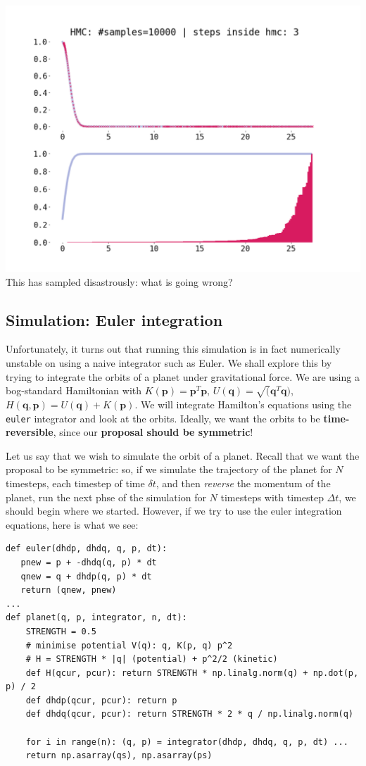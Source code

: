 \documentclass[titlepage]{article}
\newcommand{\p}{\mathbf{p}}
\newcommand{\q}{\mathbf{q}}
\begin{document}
\includegraphics[width=\textwidth]{mcmc-hmc-WRONG-euler-1d-exp.png}
This has sampled disastrously: what is going wrong?

\subsection{Simulation: Euler integration}
Unfortunately, it turns out that running this simulation is in fact numerically
unstable on using a naive integrator such as Euler. We shall explore this
by trying to integrate the orbits of a planet under gravitational force. 
We are using a bog-standard Hamiltonian with 
$K(\p) = \p^T \p$, $U(\q) = \sqrt(\q^T \q)$, $H(\q, \p) = U(\q) + K(\p)$.
We will integrate Hamilton's equations using the \texttt{euler} integrator
and look at the orbits. Ideally, we want the orbits to be \textbf{time-reversible},
since our \textbf{proposal should be symmetric}!

Let us say that we wish to simulate the orbit of a planet. Recall that we want
the proposal to be symmetric: so, if we simulate the trajectory of the planet
for $N$ timesteps, each timestep of time $\delta t$, and then \emph{reverse}
the momentum of the planet, run the next phse of the simulation for $N$
timesteps with timestep $\Delta t$, we should begin where we started. However,
if we try to use the euler integration equations, here is what we see:

\begin{verbatim}
def euler(dhdp, dhdq, q, p, dt):
   pnew = p + -dhdq(q, p) * dt
   qnew = q + dhdp(q, p) * dt
   return (qnew, pnew)
...
def planet(q, p, integrator, n, dt):
    STRENGTH = 0.5
    # minimise potential V(q): q, K(p, q) p^2
    # H = STRENGTH * |q| (potential) + p^2/2 (kinetic)
    def H(qcur, pcur): return STRENGTH * np.linalg.norm(q) + np.dot(p, p) / 2
    def dhdp(qcur, pcur): return p
    def dhdq(qcur, pcur): return STRENGTH * 2 * q / np.linalg.norm(q)

    for i in range(n): (q, p) = integrator(dhdp, dhdq, q, p, dt) ...
    return np.asarray(qs), np.asarray(ps)
\end{verbatim}
\end{document}
